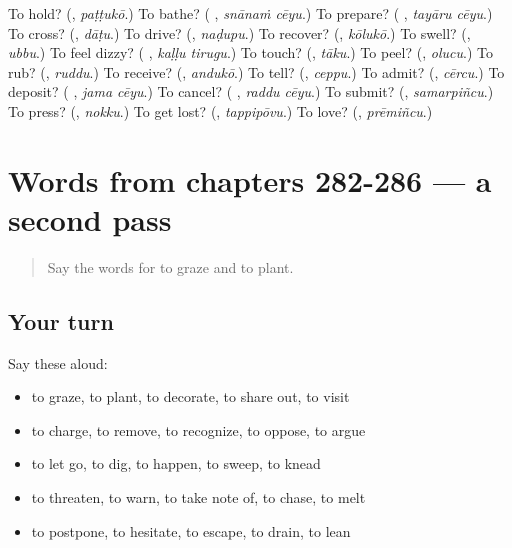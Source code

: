 \begin{tcolorbox}[breakable,colback=teal!4,colframe=teal!35!black,title={Before you move on}]
To hold? (\textbf{}, \emph{paṭṭukō}.) To bathe? (\textbf{ }, \emph{snānaṁ cēyu}.) To prepare? (\textbf{ }, \emph{tayāru cēyu}.) To cross? (\textbf{}, \emph{dāṭu}.) To drive? (\textbf{}, \emph{naḍupu}.) To recover? (\textbf{}, \emph{kōlukō}.) To swell? (\textbf{}, \emph{ubbu}.) To feel dizzy? (\textbf{ }, \emph{kaḷḷu tirugu}.) To touch? (\textbf{}, \emph{tāku}.) To peel? (\textbf{}, \emph{olucu}.) To rub? (\textbf{}, \emph{ruddu}.) To receive? (\textbf{}, \emph{andukō}.) To tell? (\textbf{}, \emph{ceppu}.) To admit? (\textbf{}, \emph{cērcu}.) To deposit? (\textbf{ }, \emph{jama cēyu}.) To cancel? (\textbf{ }, \emph{raddu cēyu}.) To submit? (\textbf{}, \emph{samarpiñcu}.) To press? (\textbf{}, \emph{nokku}.) To get lost? (\textbf{}, \emph{tappipōvu}.) To love? (\textbf{}, \emph{prēmiñcu}.)
\end{tcolorbox}
\section[(dialogue)]{Words from chapters 282-286 — a second pass}

\label{lesson:TE-R286-second-pass-words-from-chapters-282-286}



\begin{quote}
Say the words for to graze and to plant.
\end{quote}

\subsection*{Your turn}
Say these aloud:

\begin{itemize}
\raggedright
  \item to graze, to plant, to decorate, to share out, to visit
  \item to charge, to remove, to recognize, to oppose, to argue
  \item to let go, to dig, to happen, to sweep, to knead
  \item to threaten, to warn, to take note of, to chase, to melt
  \item to postpone, to hesitate, to escape, to drain, to lean
\end{itemize}

